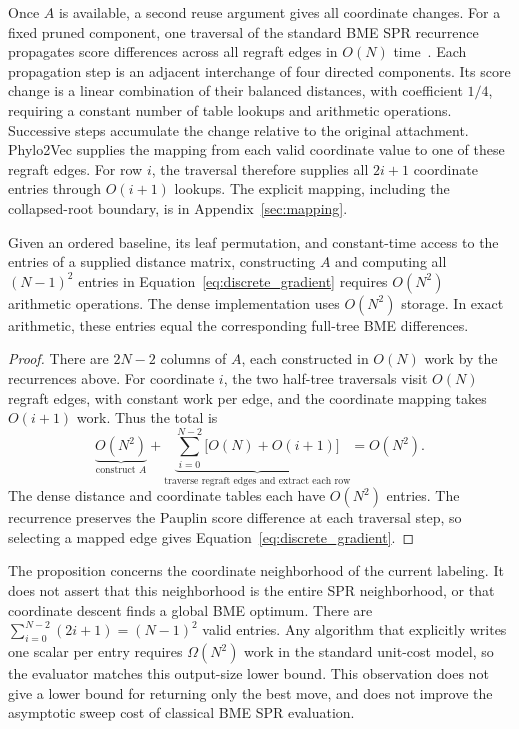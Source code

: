 Once $A$ is available, a second reuse argument gives all coordinate changes.
For a fixed pruned component, one traversal of the standard BME SPR recurrence propagates score differences across all regraft edges in $O(N)$ time~\cite{hordijk2005spr}.
Each propagation step is an adjacent interchange of four directed components.
Its score change is a linear combination of their balanced distances, with coefficient $1/4$, requiring a constant number of table lookups and arithmetic operations.
Successive steps accumulate the change relative to the original attachment.
Phylo2Vec supplies the mapping from each valid coordinate value to one of these regraft edges.
For row $i$, the traversal therefore supplies all $2i+1$ coordinate entries through $O(i+1)$ lookups.
The explicit mapping, including the collapsed-root boundary, is in Appendix~\ref{sec:mapping}.

\begin{proposition}
\label{prop:quadratic}
Given an ordered baseline, its leaf permutation, and constant-time access to the entries of a supplied distance matrix, constructing $A$ and computing all $(N-1)^2$ entries in Equation~\eqref{eq:discrete_gradient} requires $O(N^2)$ arithmetic operations.
The dense implementation uses $O(N^2)$ storage.
In exact arithmetic, these entries equal the corresponding full-tree BME differences.
\end{proposition}
\begin{proof}
There are $2N-2$ columns of $A$, each constructed in $O(N)$ work by the recurrences above.
For coordinate $i$, the two half-tree traversals visit $O(N)$ regraft edges, with constant work per edge, and the coordinate mapping takes $O(i+1)$ work.
Thus the total is
\[
 \underbrace{O(N^2)}_{\text{construct }A}
 +\underbrace{\sum_{i=0}^{N-2}\bigl[O(N)+O(i+1)\bigr]}_{\text{traverse regraft edges and extract each row}}
 =O(N^2).
\]
The dense distance and coordinate tables each have $O(N^2)$ entries.
The recurrence preserves the Pauplin score difference at each traversal step, so selecting a mapped edge gives Equation~\eqref{eq:discrete_gradient}.
\end{proof}

The proposition concerns the coordinate neighborhood of the current labeling.
It does not assert that this neighborhood is the entire SPR neighborhood, or that coordinate descent finds a global BME optimum.
There are $\sum_{i=0}^{N-2}(2i+1)=(N-1)^2$ valid entries.
Any algorithm that explicitly writes one scalar per entry requires $\Omega(N^2)$ work in the standard unit-cost model, so the evaluator matches this output-size lower bound.
This observation does not give a lower bound for returning only the best move, and does not improve the asymptotic sweep cost of classical BME SPR evaluation.

